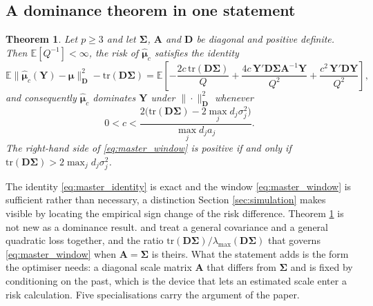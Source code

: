 \documentclass[a4paper,fleqn]{cas-sc}
\theoremstyle{plain}
\newtheorem{theorem}{Theorem}
\theoremstyle{definition}
\theoremstyle{remark}
\newcommand{\rev}[1]{#1}
\newcommand{\tr}{\mathrm{tr}}
\newcommand{\E}{\mathbb{E}}
\begin{document}
\subsection{A dominance theorem in one statement}

\begin{theorem}
\label{thm:master}
Let $p\ge3$ and let $\bm\Sigma$, $\bm A$ and $\bm D$ be diagonal and positive definite. Then $\E[Q^{-1}]<\infty$, the risk of $\hat{\bm\mu}_c$ satisfies the identity
\begin{equation}
\label{eq:master_identity}
\E\bigl\|\hat{\bm\mu}_c(\bm Y)-\bm\mu\bigr\|^2_{\bm D}
-\tr(\bm D\bm\Sigma)
=
\E\left[
-\frac{2c\,\tr(\bm D\bm\Sigma)}{Q}
+\frac{4c\,\bm Y'\bm D\bm\Sigma\bm A^{-1}\bm Y}{Q^{2}}
+\frac{c^{2}\,\bm Y'\bm D\bm Y}{Q^{2}}
\right],
\end{equation}
and consequently $\hat{\bm\mu}_c$ dominates $\bm Y$ under $\|\cdot\|^2_{\bm D}$ whenever
\begin{equation}
\label{eq:master_window}
0<c<\frac{2\bigl(\tr(\bm D\bm\Sigma)-2\max_{j}d_j\sigma^2_j\bigr)}{\max_{j}d_ja_j} .
\end{equation}
The right-hand side of \eqref{eq:master_window} is positive if and only if $\tr(\bm D\bm\Sigma)>2\max_{j}d_j\sigma^2_j$.
\end{theorem}

The identity \eqref{eq:master_identity} is exact and the window \eqref{eq:master_window} is sufficient rather than necessary, a distinction Section \ref{sec:simulation} makes visible by locating the empirical sign change of the risk difference. \rev{Theorem \ref{thm:master} is not new as a dominance result. \citet{bock1975} and \citet{berger1976jmva} treat a general covariance and a general quadratic loss together, and the ratio $\tr(\bm D\bm\Sigma)/\lambda_{\max}(\bm D\bm\Sigma)$ that governs \eqref{eq:master_window} when $\bm A=\bm\Sigma$ is theirs. What the statement adds is the form the optimiser needs: a diagonal scale matrix $\bm A$ that differs from $\bm\Sigma$ and is fixed by conditioning on the past, which is the device that lets an estimated scale enter a risk calculation.} \rev{Five} specialisations carry the argument of the paper.
\end{document}
